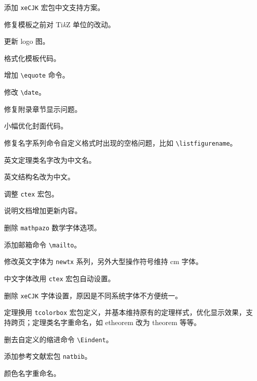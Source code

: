 \documentclass[lang=cn,newtx,10pt,scheme=chinese,pad,twocol]{zznote}
\begin{document}

\begin{change}
	\item 添加 \lstinline{xeCJK} 宏包中文支持方案。
	\item 修复模板之前对 Ti\textit{k}Z 单位的改动。
	\item 更新 logo 图。
\end{change}


\begin{change}
	\item 格式化模板代码。
	\item 增加 \lstinline{\equote} 命令。
	\item 修改 \lstinline{\date}。
\end{change}


\begin{change}
	\item 修复附录章节显示问题。
	\item 小幅优化封面代码。
\end{change}


\begin{change}
	\item 修复名字系列命令自定义格式时出现的空格问题，比如 \lstinline{\listfigurename}。
	\item 英文定理类名字改为中文名。
	\item 英文结构名改为中文。
\end{change}


\begin{change}
	\item 调整 \lstinline{ctex} 宏包。
	\item 说明文档增加更新内容。
\end{change}


\begin{change}
	\item 删除 \lstinline{mathpazo} 数学字体选项。
	\item 添加邮箱命令 \lstinline{\mailto}。
	\item 修改英文字体为 \lstinline{newtx} 系列，另外大型操作符号维持 cm 字体。
	\item 中文字体改用 \lstinline{ctex} 宏包自动设置。
	\item 删除 \lstinline{xeCJK} 字体设置，原因是不同系统字体不方便统一。
	\item 定理换用 \lstinline{tcolorbox} 宏包定义，并基本维持原有的定理样式，优化显示效果，支持跨页；定理类名字重命名，如 etheorem 改为 theorem 等等。
	\item 删去自定义的缩进命令 \lstinline{\Eindent}。
	\item 添加参考文献宏包 \lstinline{natbib}。
	\item 颜色名字重命名。
\end{change}
\end{document}
